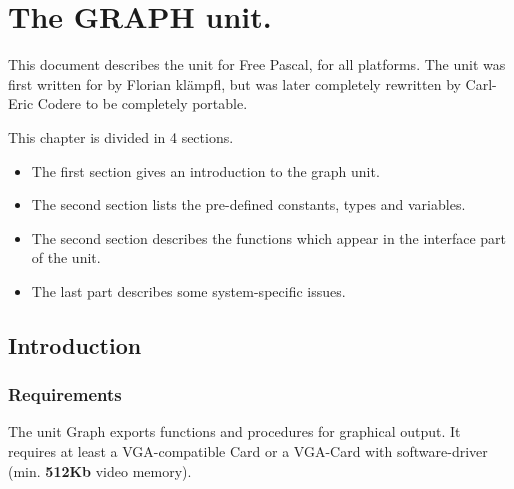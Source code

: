 %
%
%
%
%
\chapter{The GRAPH unit.}
This document describes the  unit for Free Pascal, for all
platforms. The unit was first written for \dos by Florian kl\"ampfl, but was
later completely rewritten by Carl-Eric Codere to be completely portable.

This chapter is divided in 4 sections. 
\begin{itemize}
\item The first section gives an introduction to the graph unit.
\item The second section lists the pre-defined constants, types and variables. 
\item The second section describes the functions which appear in the
interface part of the  unit.
\item The last part describes some system-specific issues.

\end{itemize}
\section{Introduction}
\label{se:Introduction}
\subsection{Requirements}
The unit Graph exports functions and procedures for graphical output.
It requires at least a VGA-compatible Card or a VGA-Card with software-driver
(min. \textbf{512Kb} video memory).
